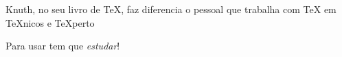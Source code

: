 \documentclass[a4paper]{article}
\begin{document}
Knuth, no seu livro de \TeX{},
faz diferencia o pessoal
que trabalha com \TeX{} em
\TeX{}nicos e \TeX perto

Para usar tem que \textsl{estudar}!
\end{document}

